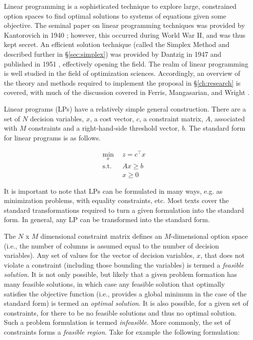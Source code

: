 Linear programming is a sophisticated technique to explore large, constrained
option spaces to find optimal solutions to systems of equations given some
objective. The seminal paper on linear programming techniques was provided by
Kantorovich in 1940 \cite{kantorovich_new_1940}; however, this occurred during
World War II, and was thus kept secret. An efficient solution technique (called
the Simplex Method and described further in \S\ref{sec:simplex}) was provided by
Dantzig in 1947 and published in 1951 \cite{dantzig_maximization_1951},
effectively opening the field. The realm of linear programming is well studied
in the field of optimization sciences. Accordingly, an overview of the theory
and methods required to implement the proposal in \S \ref{ch:research} is
covered, with much of the discussion covered in Ferris, Mangasarian, and
Wright \cite{ferris_linear_2008}.

Linear programs (LPs) have a relatively simple general construction. There are a
set of $N$ decision variables, $x$, a cost vector, $c$, a constraint matrix,
$A$, associated with $M$ constraints and a right-hand-side threshold vector,
$b$. The standard form for linear programs is as follows.

\begin{subequations}\label{eqs:std-form}
  \begin{align}
    \min_{x} \:\: & 
    z = c^{\top} x
    & \label{eqs:std-form_obj} \\
    \text{s.t.} \:\: &
    A x \geq b 
    & \label{eqs:std-form_sup} \\
    &
    x \geq 0
    &\label{eqs:std-form_x}
  \end{align}
\end{subequations}

It is important to note that LPs can be formulated in many ways, e.g. as
minimization problems, with equality constraints, etc. Most texts cover the
standard transformations required to turn a given formulation into the standard
form. In general, any LP can be transformed into the standard form.

The $N$ x $M$ dimensional constraint matrix defines an $M$-dimensional option
space (i.e., the number of columns is assumed equal to the number of decision
variables). Any set of values for the vector of decision variables, $x$, that
does not violate a constraint (including those bounding the variables) is termed
a \textit{feasible solution}. It is not only possible, but likely that a given
problem formation has many feasible solutions, in which case any feasible
solution that optimally satisfies the objective function (i.e., provides a
global minimum in the case of the standard form) is termed an \textit{optimal
solution}. It is also possible, for a given set of constraints, for there to be
no feasible solutions and thus no optimal solution. Such a problem formulation
is termed \textit{infeasible}. More commonly, the set of constraints forms
a \textit{feasible region}. Take for example the following formulation:

